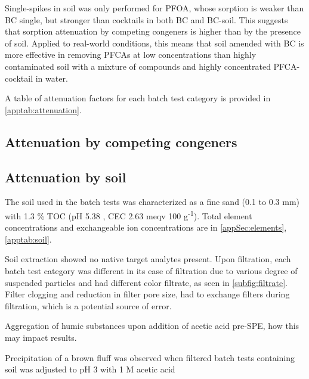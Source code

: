 Single-spikes in soil was only performed for PFOA, whose sorption is weaker than BC single, but stronger than cocktails in both BC and BC-soil. This suggests that sorption attenuation by competing congeners is higher than by the presence of soil. Applied to real-world conditions, this means that soil amended with BC is more effective in removing PFCAs at low concentrations than highly contaminated soil with a mixture of compounds and highly concentrated PFCA-cocktail in water. 

A table of attenuation factors for each batch test category is provided in \cref{apptab:attenuation}.

\subsection{Attenuation by competing congeners}

\subsection{Attenuation by soil}
The soil used in the batch tests was characterized as a fine sand (0.1 to 0.3 mm) with 1.3 \% TOC (pH 5.38 , CEC 2.63  meqv 100 g\textsuperscript{-1}). Total element concentrations and exchangeable ion concentrations are in \cref{appSec:elements}, \cref{apptab:soil}. 

Soil extraction showed no native target analytes present. Upon filtration, each batch test category was different in its ease of filtration due to various degree of suspended particles and had different color filtrate, as seen in \cref{subfig:filtrate}. Filter clogging and reduction in filter pore size, had to exchange filters during filtration, which is a potential source of error. 

Aggregation of humic substances upon addition of acetic acid pre-SPE, how this may impact results. 

Precipitation of a brown fluff was observed when filtered batch tests containing soil was adjusted to pH 3 with 1 M acetic acid

